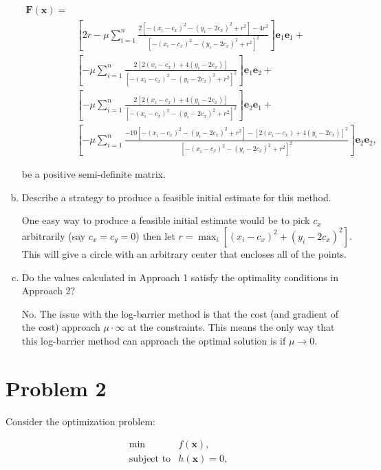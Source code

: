 \documentclass{article}
\begin{document}
\begin{enumerate}[a)]
\begin{eqnarray*}
\mathbf{F(\mathbf{x})} = &\\
&\left[ 2r - \mu \sum_{i=1}^n \frac{2\left[-(x_i-c_x)^2-(y_i-2c_x)^2+r^2\right] - 4r^2}{\left[-(x_i - c_x)^2 - (y_i - 2c_x)^2 + r^2\right]^2} \right]\mathbf{e}_1\mathbf{e}_1 + \\
&\left[ - \mu \sum_{i=1}^n \frac{2\left[2(x_i-c_x)+4(y_i-2c_x)\right]}{\left[-(x_i - c_x)^2 - (y_i - 2c_x)^2 + r^2\right]^2} \right]\mathbf{e}_1\mathbf{e}_2 + \\
&\left[ - \mu \sum_{i=1}^n \frac{2\left[2(x_i-c_x)+4(y_i-2c_x)\right]}{\left[-(x_i - c_x)^2 - (y_i - 2c_x)^2 + r^2\right]^2} \right]\mathbf{e}_2\mathbf{e}_1 + \\
&\left[ - \mu \sum_{i=1}^n \frac{-10\left[-(x_i - c_x)^2 - (y_i - 2c_x)^2 + r^2\right] - \left[2(x_i-c_x)+4(y_i-2c_x)\right]^2}{\left[-(x_i - c_x)^2 - (y_i - 2c_x)^2 + r^2\right]^2} \right]\mathbf{e}_2\mathbf{e}_2,
\end{eqnarray*}

be a positive semi-definite matrix.
	
	\item Describe a strategy to produce a feasible initial estimate for this method.
	
	One easy way to produce a feasible initial estimate would be to pick $c_x$ arbitrarily (say $c_x = c_y = 0$) then let $r = \max_i\left[(x_i-c_x)^2 + (y_i-2c_x)^2\right]$.
	This will give a circle with an arbitrary center that encloses all of the points.
	
	\item Do the values calculated in Approach 1 satisfy the optimality conditions in Approach 2?
	
	No.
	The issue with the log-barrier method is that the cost (and gradient of the cost) approach $\mu \cdot \infty$ at the constraints.
	This means the only way that this log-barrier method can approach the optimal solution is  if $\mu \rightarrow 0$.
	
\end{enumerate}

\newpage

\section{Problem 2}

Consider the optimization problem:

\begin{eqnarray*}
\min & f(\mathbf{x}), \\
\text{subject to} & h(\mathbf{x}) = 0,
\end{eqnarray*}
\end{document}
